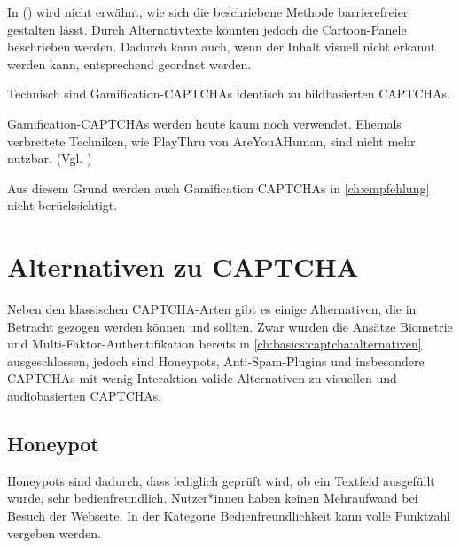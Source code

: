In  (\cite{gamified}) wird nicht erwähnt, wie sich die beschriebene Methode barrierefreier gestalten lässt.
Durch Alternativtexte könnten jedoch die Cartoon-Panele beschrieben werden.
Dadurch kann auch, wenn der Inhalt visuell nicht erkannt werden kann, entsprechend geordnet werden.

Technisch sind Gamification-CAPTCHAs identisch zu bildbasierten CAPTCHAs.

Gamification-CAPTCHAs werden heute kaum noch verwendet.
Ehemals verbreitete Techniken, wie PlayThru von AreYouAHuman, sind nicht mehr nutzbar. (Vgl. \cite{ivan})

Aus diesem Grund werden auch Gamification CAPTCHAs in \autoref{ch:empfehlung} nicht berücksichtigt.


\section{Alternativen zu CAPTCHA}
Neben den klassischen CAPTCHA-Arten gibt es einige Alternativen, die in Betracht gezogen werden können und sollten.
Zwar wurden die Ansätze Biometrie und Multi-Faktor-Authentifikation bereits in \autoref{ch:basics:captcha:alternativen}
ausgeschlossen, jedoch sind Honeypots, Anti-Spam-Plugins und insbesondere CAPTCHAs mit wenig Interaktion valide Alternativen 
zu visuellen und audiobasierten CAPTCHAs. 

\subsection{Honeypot}
Honeypots sind dadurch, dass lediglich geprüft wird, ob ein Textfeld ausgefüllt wurde, sehr bedienfreundlich.
Nutzer*innen haben keinen Mehraufwand bei Besuch der Webseite. 
In der Kategorie Bedienfreundlichkeit kann volle Punktzahl vergeben werden.

